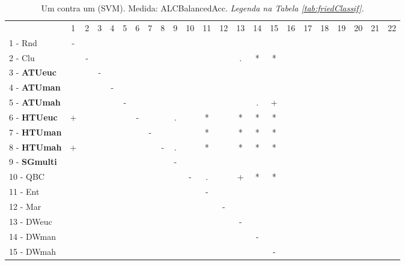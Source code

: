 \begin{table}[h]
\caption{Um contra um (SVM). Medida: ALCBalancedAcc. \textit{Legenda na Tabela \ref{tab:friedClassif}.}}
\begin{center}\begin{tabular}{lcc|cc|cc|cc|cc|cc|cc|cc|cc|cc|cc}
 			& 1 & 2 & 3 & 4 & 5 & 6 & 7 & 8 & 9 & 10 & 11 & 12 & 13 & 14 & 15 & 16 & 17 & 18 & 19 & 20 & 21 & 22\\
1 - Rnd  	& - &   &   &   &   &   &   &   &   &   &   &   &   &   &   &   &   &   &   &   &   &   \\
2 - Clu  	&   & - &   &   &   &   &   &   &   &   &   &   & . & * & * &   &   &   &   &   &   &   \\ \hline
3 - \textbf{ATUeuc}	&   &   & - &   &   &   &   &   &   &   &   &   &   &   &   &   &   &   &   &   &   &   \\
4 - \textbf{ATUman}	&   &   &   & - &   &   &   &   &   &   &   &   &   &   &   &   &   &   &   &   &   &   \\ \hline
5 - \textbf{ATUmah}	&   &   &   &   & - &   &   &   &   &   &   &   &   & . & + &   &   &   &   &   &   &   \\
6 - \textbf{HTUeuc}	& + &   &   &   &   & - &   &   & . &   & * &   & * & * & * &   &   &   &   &   &   &   \\ \hline
7 - \textbf{HTUman}	&   &   &   &   &   &   & - &   &   &   & * &   & * & * & * &   &   &   &   &   &   &   \\
8 - \textbf{HTUmah}	& + &   &   &   &   &   &   & - & . &   & * &   & * & * & * &   &   &   &   &   &   &   \\ \hline
9 - \textbf{SGmulti}	&   &   &   &   &   &   &   &   & - &   &   &   &   &   &   &   &   &   &   &   &   &   \\
10 - QBC  	&   &   &   &   &   &   &   &   &   & - & . &   & + & * & * &   &   &   &   &   &   &   \\ \hline
11 - Ent  	&   &   &   &   &   &   &   &   &   &   & - &   &   &   &   &   &   &   &   &   &   &   \\
12 - Mar  	&   &   &   &   &   &   &   &   &   &   &   & - &   &   &   &   &   &   &   &   &   &   \\ \hline
13 - DWeuc	&   &   &   &   &   &   &   &   &   &   &   &   & - &   &   &   &   &   &   &   &   &   \\
14 - DWman	&   &   &   &   &   &   &   &   &   &   &   &   &   & - &   &   &   &   &   &   &   &   \\ \hline
15 - DWmah	&   &   &   &   &   &   &   &   &   &   &   &   &   &   & - &   &   &   &   &   &   &   \\

\end{tabular}
\end{center}
\end{table}
